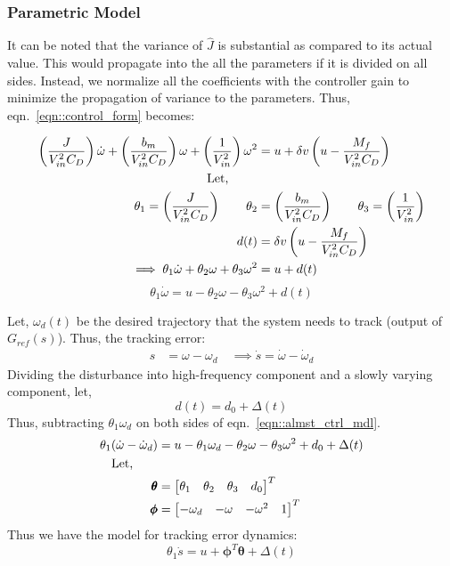 \subsubsection{Parametric Model}
It can be noted that the variance of $\hat J$ is substantial as compared to its
actual value. This would propagate into the all the parameters if it is divided
on all sides. Instead, we normalize all the coefficients with the controller
gain to minimize the propagation of variance to the parameters. Thus,
eqn.~\ref{eqn::control_form} becomes:

\begin{align*}
    \left( \frac{J}{V_{in}^2 C_D} \right) \dot \omega + \left( \frac{b_m}{V_{in}^2 C_D} \right) \omega + \left( \frac{1}{V_{in}^2} \right) \omega^2  &= u + \delta v \left( u - \frac{M_f}{V_{in}^2 C_D} \right)\\
    \text{Let, } \qquad &\\
    \theta_1 = \left( \frac{J}{V_{in}^2 C_D} \right) \qquad
    \theta_2 &= \left( \frac{b_m}{V_{in}^2 C_D} \right)\qquad
    \theta_3 = \left( \frac{1}{V_{in}^2} \right)\\
    d(t) &= \delta v \left( u - \frac{M_f}{V_{in}^2 C_D} \right)\\
    \implies \theta_1 \dot \omega + \theta_2 \omega + \theta_3 \omega^2 &= u + d(t)
\end{align*}
\begin{equation}\label{eqn::almst_ctrl_mdl}
    \theta_1 \dot \omega = u - \theta_2 \omega - \theta_3 \omega^2 + d(t)
\end{equation}

Let, $\omega_d(t)$ be the desired trajectory that the system needs to track
(output of $G_{ref}(s)$). Thus, the tracking error:
\begin{align*}
    s &= \omega - \omega_d \quad \implies \dot s = \dot \omega - \dot \omega_d
\end{align*}
Dividing the disturbance into high-frequency component and a slowly varying
component, let, $$d(t) = d_0 + \Delta(t)$$
Thus, subtracting $\theta_1 \omega_d$ on both sides of eqn.~\ref{eqn::almst_ctrl_mdl}.
\begin{align*}
    \theta_1 (\dot \omega - \dot \omega_d) &= u - \theta_1 \omega_d - \theta_2 \omega - \theta_3 \omega^2 + d_0 + \Delta(t)\\
    \text{Let,} \qquad\\
    \pmb \theta &= \begin{bmatrix} \theta_1 & \theta_2 & \theta_3 & d_0 \end{bmatrix}^T\\
    \pmb \phi &= \begin{bmatrix} -\omega_d & -\omega & - \omega^2 & 1 \end{bmatrix}^T\\
\end{align*}
Thus we have the model for tracking error dynamics:
\begin{equation}\label{eqn::error_dyn}
    \theta_1 \dot s = u + \pmb \phi^T \pmb \theta + \Delta(t)
\end{equation}


